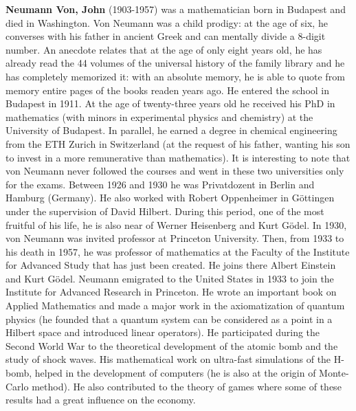 \textbf{Neumann Von, John} (1903-1957) was a mathematician born in Budapest and died in Washington. Von Neumann was a child prodigy: at the age of six, he converses with his father in ancient Greek and can mentally divide a 8-digit number. An anecdote relates that at the age of only eight years old, he has already read the 44 volumes of the universal history of the family library and he has completely memorized it: with an absolute memory, he is able to quote from memory entire pages of the books readen years ago. He entered the school in Budapest in 1911. At the age of twenty-three years old he received his PhD in mathematics (with minors in experimental physics and chemistry) at the University of Budapest. In parallel, he earned a degree in chemical engineering from the ETH Zurich in Switzerland (at the request of his father, wanting his son to invest in a more remunerative than mathematics). It is interesting to note that von Neumann never followed the courses and went in these two universities only for the exams. Between 1926 and 1930 he was Privatdozent in Berlin and Hamburg (Germany). He also worked with Robert Oppenheimer in Göttingen under the supervision of David Hilbert. During this period, one of the most fruitful of his life, he is also near of Werner Heisenberg and Kurt Gödel. In 1930, von Neumann was invited professor at Princeton University. Then, from 1933 to his death in 1957, he was professor of mathematics at the Faculty of the Institute for Advanced Study that has just been created. He joins there Albert Einstein and Kurt Gödel. Neumann emigrated to the United States in 1933 to join the Institute for Advanced Research in Princeton. He wrote an important book on Applied Mathematics and made a major work in the axiomatization of quantum physics (he founded that a quantum system can be considered as a point in a Hilbert space and introduced linear operators). He participated during the Second World War to the theoretical development of the atomic bomb and the study of shock waves. His mathematical work on ultra-fast simulations of the H-bomb, helped in the development of computers (he is also at the origin of Monte-Carlo method). He also contributed to the theory of games where some of these results had a great influence on the economy.

